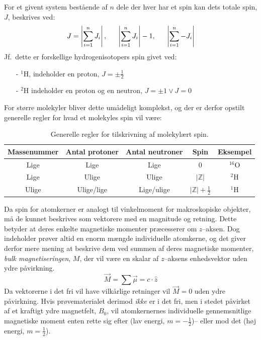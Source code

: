     For et givent system bestående af $n$ dele der hver har et spin kan dets totale spin, $J$, beskrives ved:
    \[
        J=\left|\sum_{i=1}^n J_i\right|, \hskip 16pt \left|\sum_{i=1}^n J_i\right|-1, \hskip 16pt \left|\sum_{i=1}^n -J_i\right|
    \]
    Jf.\ dette er forskellige hydrogenisotopers spin givet ved:
    \begin{itemize}
        \item[-] $^1$H, indeholder en proton, $J=\pm\frac{1}{2}$ 
        \item[-] $^2$H indeholder en proton og en neutron, $J=\pm 1 \vee J=0$ 
    \end{itemize}
    For større molekyler bliver dette umådeligt komplekst, og der er derfor opstilt generelle regler for hvad et molekyles spin vil være:
    \begin{table}[H]\centering
        \caption{Generelle regler for tilskrivning af molekylært spin.}
        \begin{tabular}{ccccc}
            \toprule
            Massenummer & Antal protoner & Antal neutroner & Spin & Eksempel \\
            \midrule
            Lige & Lige & Lige & $0$ & $^{16}$O \\
            Lige & Ulige & Ulige & $\left|\mathbb{Z}\right|$ & $^2$H \\
            Ulige & Ulige/lige & Lige/ulige &  $\left|\mathbb{Z}\right|+\frac{1}{2}$ & $^1$H \\
            \bottomrule
        \end{tabular}
    \end{table}
    Da spin for atomkerner er analogt til vinkelmoment for makroskopiske objekter, må de kunnet beskrives som vektorere med en magnitude og retning. Dette betyder at deres enkelte magnetiske momenter præcesserer om $z$--aksen. Dog indeholder prøver altid en enorm mængde individuelle atomkerne, og det giver derfor mere mening at beskrive dem ved summen af deres magnetiske momenter, \textit{bulk magnetiseringen}, $M$, der vil være en skalar af $z$--aksens enhedsvektor uden ydre påvirkning. 
    \[
        \overrightarrow{M}=\sum\overrightarrow{\mu}=c\cdot \hat{z}
    \]
    Da vektorerne i det fri vil have vilkårlige retninger vil $\overrightarrow{M}=0$ uden ydre påvirkning. Hvis prøvematerialet derimod \textit{ikke}  er i det fri, men i stedet påvirket af et kraftigt ydre magnetfelt, $B_0$, vil atomkernernes individuelle gennemsnitlige magnetiske moment enten rette sig efter (lav energi, $m=-\frac{1}{2}$)-- eller mod det (høj energi, $m=\frac{1}{2}$). 
